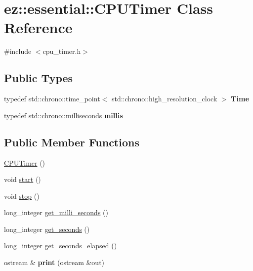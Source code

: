 \hypertarget{classez_1_1essential_1_1CPUTimer}{}\section{ez\+:\+:essential\+:\+:C\+P\+U\+Timer Class Reference}
\label{classez_1_1essential_1_1CPUTimer}


{\ttfamily \#include $<$cpu\+\_\+timer.\+h$>$}

\subsection*{Public Types}
\begin{DoxyCompactItemize}
\item 
\mbox{\label{classez_1_1essential_1_1CPUTimer_accb93c3ac1ba89c9dceedd765f4a11ee}} 
typedef std\+::chrono\+::time\+\_\+point$<$ std\+::chrono\+::high\+\_\+resolution\+\_\+clock $>$ {\bfseries Time}
\item 
\mbox{\label{classez_1_1essential_1_1CPUTimer_ac07c2f4cfa8f31ae7a99345178d8deba}} 
typedef std\+::chrono\+::milliseconds {\bfseries millis}
\end{DoxyCompactItemize}
\subsection*{Public Member Functions}
\begin{DoxyCompactItemize}
\item 
\hyperlink{classez_1_1essential_1_1CPUTimer_aa06f8e13b3c82bbb8642f4981bfff7e7}{C\+P\+U\+Timer} ()
\item 
void \hyperlink{classez_1_1essential_1_1CPUTimer_a2117cc7fd9f933bb0c6d28fdf9a9f74a}{start} ()
\item 
void \hyperlink{classez_1_1essential_1_1CPUTimer_a318dfb72b3b7e61ab90ea3699e7d66a6}{stop} ()
\item 
long\+\_\+integer \hyperlink{classez_1_1essential_1_1CPUTimer_a4a8a5f9a298400052e54c0219ff254c2}{get\+\_\+milli\+\_\+seconds} ()
\item 
long\+\_\+integer \hyperlink{classez_1_1essential_1_1CPUTimer_a5514bcd6ee6e46961b66497bf5b27751}{get\+\_\+seconds} ()
\item 
long\+\_\+integer \hyperlink{classez_1_1essential_1_1CPUTimer_a867ed5183849fa164f01a035b04e0ad5}{get\+\_\+seconds\+\_\+elapsed} ()
\item 
\mbox{\label{classez_1_1essential_1_1CPUTimer_a4fc87e7c3591adf9fec42917caa38464}} 
ostream \& {\bfseries print} (ostream \&out)
\end{DoxyCompactItemize}
